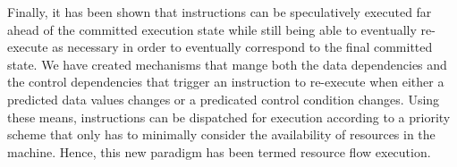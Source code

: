 Finally, it has been shown that instructions can be speculatively
executed far ahead of the committed execution state while still
being able to eventually re-execute as necessary in order to
eventually correspond to the final committed state.
We have created mechanisms that mange both the data dependencies and
the control dependencies that trigger an instruction to re-execute
when either a predicted data values changes or a predicated
control condition changes.  Using these means, instructions
can be dispatched for execution according to a priority scheme
that only has to minimally consider the availability of resources
in the machine.  Hence, this new paradigm has been termed
resource flow execution.

